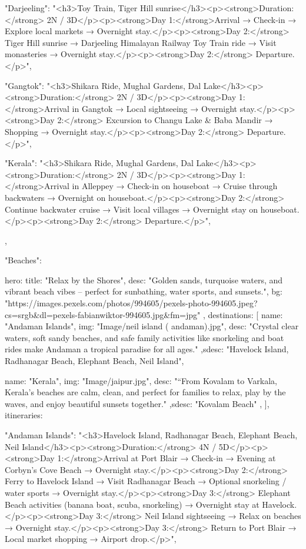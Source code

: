 {{{      "Darjeeling": "<h3>Toy Train, Tiger Hill sunrise</h3><p><strong>Duration:</strong> 2N / 3D</p><p><strong>Day 1:</strong>Arrival → Check-in → Explore local markets → Overnight stay.</p><p><strong>Day 2:</strong> Tiger Hill sunrise → Darjeeling Himalayan Railway Toy Train ride → Visit monasteries → Overnight stay.</p><p><strong>Day 2:</strong> Departure.</p>",

      "Gangtok": "<h3>Shikara Ride, Mughal Gardens, Dal Lake</h3><p><strong>Duration:</strong> 2N / 3D</p><p><strong>Day 1:</strong>Arrival in Gangtok → Local sightseeing → Overnight stay.</p><p><strong>Day 2:</strong> Excursion to Changu Lake & Baba Mandir → Shopping → Overnight stay.</p><p><strong>Day 2:</strong> Departure.</p>",

      "Kerala": "<h3>Shikara Ride, Mughal Gardens, Dal Lake</h3><p><strong>Duration:</strong> 2N / 3D</p><p><strong>Day 1:</strong>Arrival in Alleppey → Check-in on houseboat → Cruise through backwaters → Overnight on houseboat.</p><p><strong>Day 2:</strong> Continue backwater cruise → Visit local villages → Overnight stay on houseboat.</p><p><strong>Day 2:</strong> Departure.</p>",
    }
  },

 "Beaches": {
    hero: {
      title: "Relax by the Shores",
      desc: "Golden sands, turquoise waters, and vibrant beach vibes – perfect for sunbathing, water sports, and sunsets.",
      bg: "https://images.pexels.com/photos/994605/pexels-photo-994605.jpeg?cs=srgb&dl=pexels-fabianwiktor-994605.jpg&fm=jpg"
    },
    destinations: [
      { name: "Andaman Islands", img: "Image/neil island ( andaman).jpg", desc: "Crystal clear waters, soft sandy beaches, and safe family activities like snorkeling and boat rides make Andaman a tropical paradise for all ages." ,sdesc: "Havelock Island, Radhanagar Beach, Elephant Beach, Neil Island"},

      { name: "Kerala", img: "Image/jaipur.jpg", desc: "“From Kovalam to Varkala, Kerala’s beaches are calm, clean, and perfect for families to relax, play by the waves, and enjoy beautiful sunsets together." ,sdesc: "Kovalam Beach" },
    ],
    itineraries: {
      "Andaman Islands": "<h3>Havelock Island, Radhanagar Beach, Elephant Beach, Neil Island</h3><p><strong>Duration:</strong> 4N / 5D</p><p><strong>Day 1:</strong>Arrival at Port Blair → Check-in → Evening at Corbyn’s Cove Beach → Overnight stay.</p><p><strong>Day 2:</strong> Ferry to Havelock Island → Visit Radhanagar Beach → Optional snorkeling / water sports → Overnight stay.</p><p><strong>Day 3:</strong> Elephant Beach activities (banana boat, scuba, snorkeling) → Overnight stay at Havelock.</p><p><strong>Day 3:</strong> Neil Island sightseeing → Relax on beaches → Overnight stay.</p><p><strong>Day 3:</strong> Return to Port Blair → Local market shopping → Airport drop.</p>",

}}}
